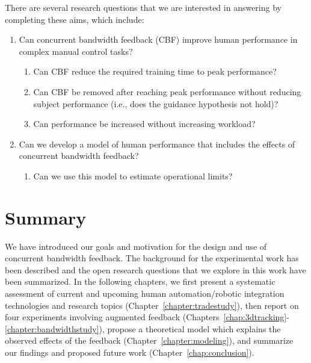 There are several research questions that we are interested in answering by completing these aims, which include:
\begin{enumerate}
    \item Can concurrent bandwidth feedback (CBF) improve human performance in complex manual control tasks?
          \begin{enumerate}
              \item Can CBF reduce the required training time to peak performance?
              \item Can CBF be removed after reaching peak performance without reducing subject performance (i.e., does the guidance hypothesis not hold)?
              \item Can performance be increased without increasing workload?
          \end{enumerate}
    \item Can we develop a model of human performance that includes the effects of concurrent bandwidth feedback?
          \begin{enumerate}
              \item Can we use this model to estimate operational limits?
          \end{enumerate}
\end{enumerate}

\section{Summary}
We have introduced our goals and motivation for the design and use of concurrent bandwidth feedback.
The background for the experimental work has been described and the open research questions that we explore in this work have been summarized.
In the following chapters, we first present a systematic assessment of current and upcoming human automation/robotic integration technologies and research topics (Chapter~\ref{chapter:tradestudy}), then report on four experiments involving augmented feedback (Chapters~\ref{chap:3dtracking}-\ref{chapter:bandwidthstudy}), propose a theoretical model which explains the observed effects of the feedback (Chapter~\ref{chapter:modeling}), and summarize our findings and proposed future work (Chapter~\ref{chap:conclusion}).
